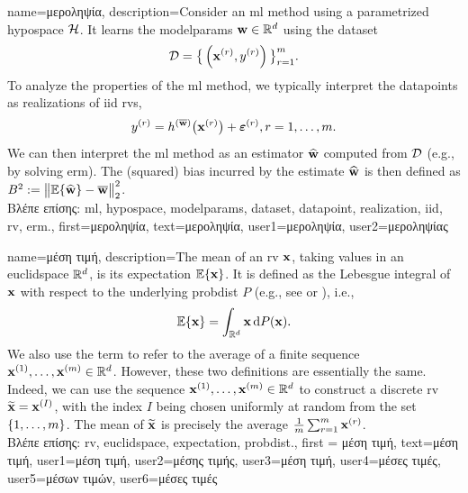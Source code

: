 {
	name={\foreignlanguage{greek}{μεροληψία}},
	description={Consider an \gls{ml} method using a parametrized \gls{hypospace} $\mathcal{H}$. 
		It learns the \gls{modelparams} ${\bf w} \in \mathbb{R}^{d}$ using the \gls{dataset} $$ \mathcal{D}=\big\{ \left( {\bf x}^{(r)},y^{(r)} \right) \big\}_{r=1}^{m}.$$ 
		To analyze the properties of the \gls{ml} method, we typically interpret the \gls{datapoint}s as \gls{realization}s 
		of \gls{iid} \gls{rv}s, $$ y^{(r)} = h^{(\overline{{\bf w}})}\big( {\bf x}^{(r)} \big) + \bm{\varepsilon}^{(r)}, r=1,\ldots,m.$$ 
		We can then interpret the \gls{ml} method as an estimator $\widehat{{\bf w}}$ 
		computed from $\mathcal{D}$ (e.g., by solving \gls{erm}). The (squared) bias incurred by the estimate $\widehat{{\bf w}}$ 
		is then defined as $B^{2} := \big\| \mathbb{E} \{ \widehat{{\bf w}}  \}- \overline{{\bf w}}\big\|_{2}^{2}$.\\
		\foreignlanguage{greek}{Βλέπε επίσης:} \gls{ml}, \gls{hypospace}, \gls{modelparams}, \gls{dataset}, \gls{datapoint}, \gls{realization}, \gls{iid}, \gls{rv}, \gls{erm}.},
first={\foreignlanguage{greek}{μεροληψία}},
text={\foreignlanguage{greek}{μεροληψία}},
user1={\foreignlanguage{greek}{μεροληψία}}, %
user2={\foreignlanguage{greek}{μεροληψίας}} %
}

{name={\foreignlanguage{greek}{μέση τιμή}},
	description={The  mean of an \gls{rv} ${\bf x}$, taking 
 values in an \gls{euclidspace} $\mathbb{R}^{d}$, is its 
 \gls{expectation} $\mathbb{E}\{{\bf x}\}$. It is defined as the Lebesgue 
 integral of ${\bf x}$ with respect to the underlying \gls{probdist} $P$ (e.g., see \cite{BillingsleyProbMeasure} or \cite{RudinBookPrinciplesMatheAnalysis}), i.e.,
\[
\mathbb{E}\{{\bf x}\} = \int_{\mathbb{R}^{d}} {\bf x} \, \mathrm{d}P({\bf x}).
\] 
We also use the term to refer to the average of a finite sequence 
${\bf x}^{(1)}, \ldots, {\bf x}^{(m)} \in \mathbb{R}^{d}$. However, 
these two definitions are essentially the same. Indeed, we can use the sequence 
${\bf x}^{(1)}, \ldots, {\bf x}^{(m)} \in \mathbb{R}^{d}$ to construct a 
discrete \gls{rv} $\widetilde{{\bf x}}={\bf x}^{(I)}$, with the index $I$ being chosen uniformly 
at random from the set $\{1,\ldots,m\}$. The mean of $\widetilde{{\bf x}}$ is 
precisely the average $\frac{1}{m} \sum_{r=1}^{m} {\bf x}^{(r)}$.\\
	\foreignlanguage{greek}{Βλέπε επίσης:} \gls{rv}, \gls{euclidspace}, \gls{expectation}, \gls{probdist}.}, 
		first = {\foreignlanguage{greek}{μέση τιμή}}, 
		text={\foreignlanguage{greek}{μέση τιμή}},
		user1={\foreignlanguage{greek}{μέση τιμή}}, %
   		user2={\foreignlanguage{greek}{μέσης τιμής}}, %
		user3={\foreignlanguage{greek}{μέση τιμή}}, %
		user4={\foreignlanguage{greek}{μέσες τιμές}}, %
   		user5={\foreignlanguage{greek}{μέσων τιμών}}, %
		user6={\foreignlanguage{greek}{μέσες τιμές}} %
}

